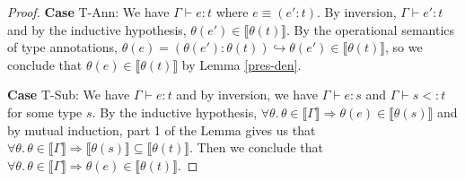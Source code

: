 \documentclass[11pt]{article}
\newcommand{\col}{\mathbin{:}}       %
\newcommand{\lb}{\llbracket}         %
\newcommand{\rb}{\rrbracket}         %
\newcommand{\step}{\hookrightarrow}
\newcommand{\foralltheta}{\forall\theta.\,\theta\in\lb\Gamma\rb}
\begin{document}
\begin{proof}
{\bf Case} {\sc T-Ann}: We have $\Gamma \vdash e : t$ where $e \equiv (e'\col t)$. By inversion, $\Gamma \vdash e' : t$ and by the inductive hypothesis, $\theta(e') \in \lb\theta(t)\rb$. By the operational semantics of type annotations, 
$\theta(e) = (\theta(e')\col\theta(t)) \step \theta(e') \in \lb\theta(t)\rb$, so we conclude that $\theta(e) \in \lb\theta(t)\rb$ by Lemma \ref{pres-den}.

{\bf Case} {\sc T-Sub}: We have $\Gamma \vdash e : t $ and by inversion, we have $\Gamma \vdash e : s$ and $\Gamma \vdash s <: t$ for some type $s$. 
By the inductive hypothesis, $\foralltheta \Rightarrow \theta(e) \in \lb\theta(s)\rb$ and by mutual induction, part 1 of the Lemma gives us that  $\foralltheta \Rightarrow \lb\theta(s)\rb \subseteq \lb\theta(t)\rb$. Then we conclude that $\foralltheta \Rightarrow \theta(e) \in \lb\theta(t)\rb$.
%
\end{proof}
\end{document}

